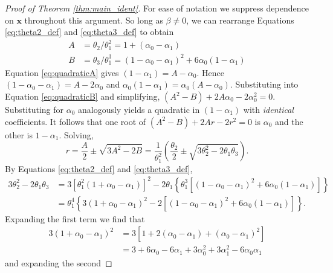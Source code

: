 \documentclass[12pt]{article}
\begin{document}
\begin{thm}
  \label{thm:main_ident}
\end{thm}
\begin{proof}[Proof of Theorem \ref{thm:main_ident}]
  For ease of notation we suppress dependence on $\mathbf{x}$ throughout this argument.
  So long as $\beta \neq 0$, we can rearrange Equations \ref{eq:theta2_def} and \ref{eq:theta3_def} to obtain 
  \begin{align}
    \label{eq:quadraticA}
  A &= \theta_2/\theta_1^2 = 1 + (\alpha_0 - \alpha_1)  \\
  \label{eq:quadraticB}
  B &= \theta_3/\theta_1^3 = (1 - \alpha_0 - \alpha_1)^2 + 6 \alpha_0 (1 - \alpha_1)
  \end{align}
  Equation \ref{eq:quadraticA} gives $(1 - \alpha_1)= A - \alpha_0$.
  Hence $(1 - \alpha_0 - \alpha_1) = A - 2\alpha_0$ and $\alpha_0(1 - \alpha_1) = \alpha_0(A - \alpha_0)$.
  Substituting into Equation \ref{eq:quadraticB} and simplifying, $(A^2 - B) + 2A \alpha_0 - 2\alpha_0^2=0$.
  Substituting for $\alpha_0$ analogously yields a quadratic in $(1 - \alpha_1)$ with \emph{identical} coefficients.
It follows that one root of $(A^2-B) + 2Ar - 2r^2=0$ is $\alpha_0$ and the other is $1 - \alpha_1$.
Solving,
  \begin{equation}
    r = \frac{A}{2} \pm \sqrt{3 A^2 - 2B} = \frac{1}{\theta_1^2}\left(\frac{\theta_2}{2} \pm  \sqrt{3\theta_2^2  - 2\theta_1 \theta_3}\right).
  \end{equation}
By Equations \ref{eq:theta2_def} and \ref{eq:theta3_def}, 
  \begin{align*}
    3\theta^2_2 - 2\theta_1 \theta_3 &= 3 \left[ \theta_1^2 \left( 1 + \alpha_0 - \alpha_1 \right) \right]^2 - 2 \theta_1 \left\{ \theta_1^3 \left[ (1 - \alpha_0 - \alpha_1)^2 + 6\alpha_0 (1 - \alpha_1) \right] \right\} \\
    &= \theta_1^4 \left\{ 3(1 + \alpha_0 - \alpha_1)^2 - 2 \left[ (1 - \alpha_0 - \alpha_1)^2 + 6 \alpha_0 (1 - \alpha_1) \right] \right\}.
  \end{align*}
Expanding the first term we find that 
  \begin{align*}
    3(1 + \alpha_0 - \alpha_1)^2 
    &= 3\left[ 1 + 2(\alpha_0 - \alpha_1) + (\alpha_0 - \alpha_1)^2 \right]\\
    &= 3 + 6\alpha_0 - 6\alpha_1 + 3 \alpha_0^2 + 3 \alpha_1^2 - 6\alpha_0\alpha_1 
  \end{align*}
and expanding the second 

\end{proof}
\end{document}
